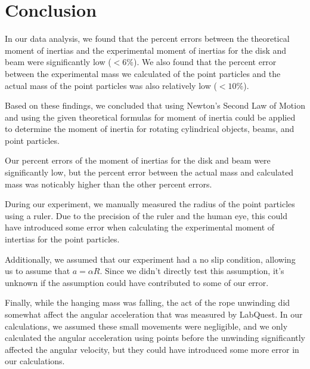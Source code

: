 \documentclass[fleqn]{article}
\begin{document}
\section*{Conclusion}
In our data analysis, we found that the percent errors between the theoretical moment of inertias and the experimental moment of inertias for the disk and beam were significantly low ($<6\%$). We also found that the percent error between the experimental mass we calculated of the point particles and the actual mass of the point particles was also relatively low ($<10\%$).

Based on these findings, we concluded that using Newton's Second Law of Motion and using the given theoretical formulas for moment of inertia could be applied to determine the moment of inertia for rotating cylindrical objects, beams, and point particles.

Our percent errors of the moment of inertias for the disk and beam were significantly low, but the percent error between the actual mass and calculated mass was noticably higher than the other percent errors.

During our experiment, we manually measured the radius of the point particles using a ruler. Due to the precision of the ruler and the human eye, this could have introduced some error when calculating the experimental moment of intertias for the point particles.

Additionally, we assumed that our experiment had a no slip condition, allowing us to assume that $a=\alpha R$. Since we didn't directly test this assumption, it's unknown if the assumption could have contributed to some of our error.

Finally, while the hanging mass was falling, the act of the rope unwinding did somewhat affect the angular acceleration that was measured by LabQuest. In our calculations, we assumed these small movements were negligible, and we only calculated the angular acceleration using points before the unwinding significantly affected the angular velocity, but they could have introduced some more error in our calculations.
\end{document}
